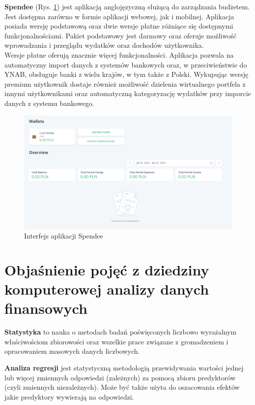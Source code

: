 \textbf{Spendee} (Rys. \ref{spendee_interfejs}) jest aplikacją anglojęzyczną służącą do zarządzania budżetem. Jest dostępna zarówno w formie aplikacji webowej, jak i mobilnej. Aplikacja posiada wersję podstawową oraz dwie wersje płatne różniące się dostępnymi funkcjonalnościami. Pakiet podstawowy jest darmowy oraz oferuje możliwość wprowadzania i przeglądu wydatków oraz dochodów użytkownika.\\
Wersje płatne oferują znacznie więcej funkcjonalności. Aplikacja pozwala na automatyczny import danych z systemów bankowych oraz, w przeciwieństwie do YNAB, obsługuje banki z wielu krajów, w tym także z Polski. Wykupując wersję premium użytkownik dostaje również możliwość dzielenia wirtualnego portfela z innymi użytkownikami oraz automatyczną kategoryzację wydatków przy imporcie danych z systemu bankowego.
\begin{figure}[!ht]
	\begin{center}
		\includegraphics[width=6in]{img/aplikacje/spendee_interfejs.png}
		\caption{Interfejs aplikacji Spendee}
		\label{spendee_interfejs}
	\end{center}
\end{figure}

\section{Objaśnienie pojęć z dziedziny komputerowej analizy danych finansowych}
\textbf{Statystyka} to nauka o metodach badań poświęconych liczbowo wyrażalnym właściwościom zbiorowości oraz wszelkie prace związane z gromadzeniem i opracowaniem masowych danych liczbowych.\cite{bptstatystyka}

\textbf{Analiza regresji} jest statystyczną metodologią przewidywania wartości jednej lub więcej zmiennych odpowiedzi (zależnych) za pomocą zbioru predyktorów (czyli zmiennych niezależnych). Może być także użyta do oszacowania efektów jakie predyktory wywierają na odpowiedzi.\cite{wielowymiarowymodelregresjiliniowej2014}

